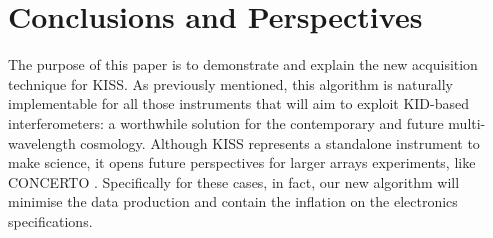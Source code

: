 \documentclass[twocolumn,traditabstract]{aa}\\
\begin{document}
\section{Conclusions and Perspectives}
\label{sec:conclu}
The purpose of this paper is to demonstrate and explain the new acquisition technique for KISS. As previously mentioned, this algorithm is naturally implementable for all those instruments that will aim to exploit KID-based interferometers: a worthwhile solution for the contemporary and future multi-wavelength cosmology. Although KISS represents a standalone instrument to make science, it opens future perspectives for larger arrays experiments, like CONCERTO \cite{concerto}. Specifically for these cases, in fact, our new algorithm will minimise the data production and contain the inflation on the electronics specifications.


\end{document}
